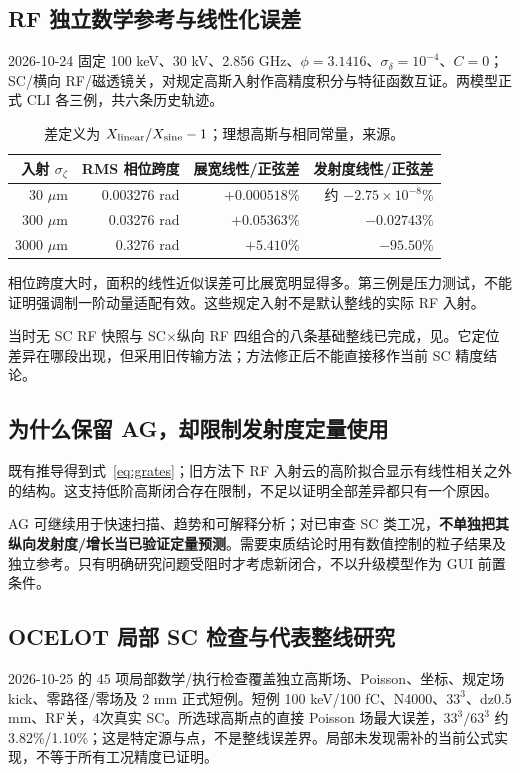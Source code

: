 \subsection{RF 独立数学参考与线性化误差}
2026-10-24 固定 100 keV、30 kV、2.856 GHz、$\phi=3.1416$、$\sigma_\delta=10^{-4}$、$C=0$；SC/横向 RF/磁透镜关，对规定高斯入射作高精度积分与特征函数互证。两模型正式 CLI 各三例，共六条历史轨迹。
\begin{table}[H]\centering\small
\begin{tabular}{rrrr}\toprule
入射 $\sigma_\zeta$ & RMS 相位跨度 & 展宽线性/正弦差 & 发射度线性/正弦差 \\ \midrule
30 $\mu$m & 0.003276 rad & $+0.000518\%$ & 约 $-2.75\times10^{-8}\%$ \\
300 $\mu$m & 0.03276 rad & $+0.05363\%$ & $-0.02743\%$ \\
3000 $\mu$m & 0.3276 rad & $+5.410\%$ & $-95.50\%$ \\
\bottomrule\end{tabular}
\caption{差定义为 $X_{\rm linear}/X_{\rm sine}-1$；理想高斯与相同常量，来源。}
\end{table}
相位跨度大时，面积的线性近似误差可比展宽明显得多。第三例是压力测试，不能证明强调制一阶动量适配有效。这些规定入射不是默认整线的实际 RF 入射。

当时无 SC RF 快照与 SC$\times$纵向 RF 四组合的八条基础整线已完成，见。它定位差异在哪段出现，但采用旧传输方法；方法修正后不能直接移作当前 SC 精度结论。

\subsection{为什么保留 AG，却限制发射度定量使用}
既有推导得到式~\eqref{eq:grates}；旧方法下 RF 入射云的高阶拟合显示有线性相关之外的结构。这支持低阶高斯闭合存在限制，不足以证明全部差异都只有一个原因。

AG 可继续用于快速扫描、趋势和可解释分析；对已审查 SC 类工况，\textbf{不单独把其纵向发射度/增长当已验证定量预测}。需要束质结论时用有数值控制的粒子结果及独立参考。只有明确研究问题受阻时才考虑新闭合，不以升级模型作为 GUI 前置条件。

\subsection{OCELOT 局部 SC 检查与代表整线研究}
2026-10-25 的 45 项局部数学/执行检查覆盖独立高斯场、Poisson、坐标、规定场 kick、零路径/零场及 2 mm 正式短例。短例 100 keV/100 fC、N4000、$33^3$、dz0.5 mm、RF关，4次真实 SC。所选球高斯点的直接 Poisson 场最大误差，$33^3/63^3$ 约 3.82\%/1.10\%；这是特定源与点，不是整线误差界。局部未发现需补的当前公式实现，不等于所有工况精度已证明。

